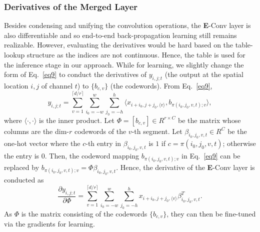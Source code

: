 \documentclass{article}
\begin{document}
	\subsubsection{Derivatives of the Merged Layer}
	Besides condensing and unifying the convolution operations, the \textbf{E}-Conv layer is also differentiable and so end-to-end back-propagation learning still remains realizable.
	However, evaluating the derivatives would be hard based on the table-lookup structure as the indices are not continuous.
	Hence, the table is used for the inference stage in our approach.
	While for learning, we slightly change the form of Eq.~\ref{eq9} to conduct the derivatives of $y_{i,j;t}$ (the output at the spatial location $i,j$ of channel $t$) to $\{b_{c,v}\}$ (the codewords).
	From Eq.~\ref{eq9}, %
	\begin{equation}
	\label{eq11}
	y_{i,j;t} =\sum_{v=1}^{\lceil d/r \rceil}\sum_{i_0=-w}^{w}\sum_{j_0=-h}^{h} \langle x_{i+i_0,j+j_0,\langle v \rangle}, b_{\pi(i_0,j_0,v,t);v} \rangle,
	\end{equation}
	where $\langle\cdot,\cdot\rangle$ is the inner product.
	Let $\Phi=[b_{c,v}]\in R^{r\times C}$ be the matrix whose columns are the dim-$r$ codewords of the $v$-th segment.
	Let $\beta_{i_0,j_0,v,t}\in R^C$ be the one-hot vector where the $c$-th entry in $\beta_{i_0,j_0,v,t}$ is $1$ if $c=\pi(i_0,j_0,v,t)$; otherwise the entry is $0$.
	Then, the codeword mapping $b_{\pi(i_0,j_0,v,t);v}$ in Eq.~\ref{eq9} can be replaced by $b_{\pi(i_0,j_0,v,t);v}=\Phi\beta_{i_0,j_0,v,t}$.
	Hence, the derivative of the \textbf{E}-Conv layer is conducted as
	\begin{equation}
	\label{eq12}
	\frac{\partial y_{i,j;t}}{\partial \Phi} = \sum_{v=1}^{\lceil d/r \rceil}\sum_{i_0=-w}^{w}\sum_{j_0=-h}^{h} x_{i+i_0,j+j_0,\langle v \rangle}\beta_{i_0,j_0,v,t}^T.
	\end{equation}
	As $\Phi$ is the matrix consisting of the codewords $\{b_{c,v}\}$, they can then be fine-tuned via the gradients for learning. %
	
	
	
	
\end{document}

